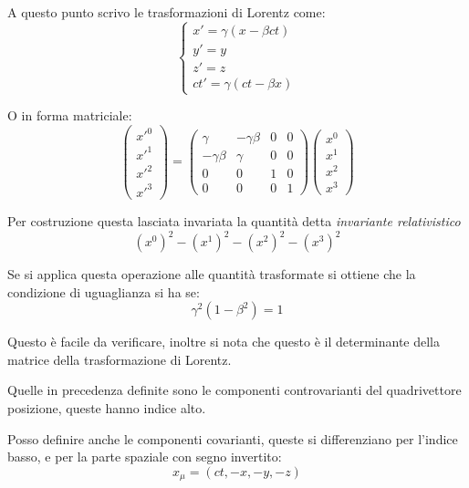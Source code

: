 \documentclass[a4paper]{scrarticle}
\begin{document}
A questo punto scrivo le trasformazioni di Lorentz come:
\begin{equation}
    \begin{cases}
        x' = \gamma (x - \beta ct)\\
        y' = y\\
        z' = z\\
        ct' = \gamma(ct - \beta x)
    \end{cases}
\end{equation}

O in forma matriciale:
\begin{equation}
    \begin{pmatrix}
        x'^0 \\ x'^1\\x'^2\\x'^3
    \end{pmatrix}
    =
    \begin{pmatrix}
        \gamma & -\gamma \beta & 0 & 0 \\
        - \gamma \beta & \gamma & 0 & 0 \\
        0 & 0 & 1 & 0 \\
        0 & 0 & 0 & 1
    \end{pmatrix}
    \begin{pmatrix}
        x^0 \\ x^1\\x^2\\x^3
    \end{pmatrix}
\end{equation}

Per costruzione questa lasciata invariata la quantità detta \emph{invariante relativistico}
\begin{equation}
    (x^0)^2 - (x^1)^2 - (x^2)^2 - (x^3)^2 
\end{equation}

Se si applica questa operazione alle quantità trasformate si ottiene che la condizione di uguaglianza si ha se:
\begin{equation}
    \gamma^2 (1 - \beta^2) = 1
\end{equation}

Questo è facile da verificare, inoltre si nota che questo è il determinante della matrice della trasformazione di Lorentz.

Quelle in precedenza definite sono le componenti controvarianti del quadrivettore posizione, queste hanno indice alto.

Posso definire anche le componenti covarianti, queste si differenziano per l'indice basso, e per la parte spaziale con segno invertito:
\begin{equation}
    x_\mu = (ct , -x,-y,-z)
\end{equation}
\end{document}
